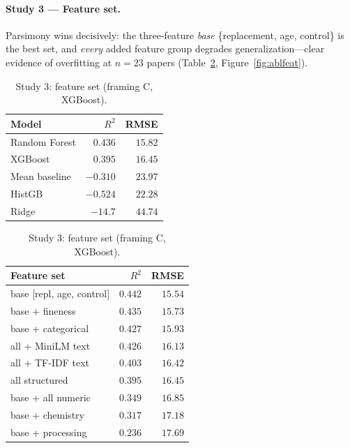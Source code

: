 \documentclass[11pt]{article}
\newcommand{\R}{$R^2$}
\begin{document}
\paragraph{Study 3 --- Feature set.}
Parsimony wins decisively: the three-feature \emph{base}
\{replacement, age, control\} is the best set, and \emph{every} added feature group
degrades generalization---clear evidence of overfitting at $n\!=\!23$ papers
(Table~\ref{tab:s3}, Figure~\ref{fig:ablfeat}).

\begin{table}[H]\centering\small
\begin{minipage}{0.46\textwidth}\centering
\caption{Study 2: model (framing C, all features).}
\label{tab:s2}
\begin{tabular}{lrr}
\toprule
Model & \R{} & RMSE \\
\midrule
\rowcolor{green!12}Random Forest & $0.436$ & $15.82$ \\
XGBoost & $0.395$ & $16.45$ \\
Mean baseline & $-0.310$ & $23.97$ \\
HistGB & $-0.524$ & $22.28$ \\
Ridge & $-14.7$ & $44.74$ \\
\bottomrule
\end{tabular}
\end{minipage}\hfill
\begin{minipage}{0.5\textwidth}\centering
\caption{Study 3: feature set (framing C, XGBoost).}
\label{tab:s3}
\begin{tabular}{lrr}
\toprule
Feature set & \R{} & RMSE \\
\midrule
\rowcolor{green!12}base [repl, age, control] & $0.442$ & $15.54$ \\
base + fineness & $0.435$ & $15.73$ \\
base + categorical & $0.427$ & $15.93$ \\
all + MiniLM text & $0.426$ & $16.13$ \\
all + TF-IDF text & $0.403$ & $16.42$ \\
all structured & $0.395$ & $16.45$ \\
base + all numeric & $0.349$ & $16.85$ \\
base + chemistry & $0.317$ & $17.18$ \\
base + processing & $0.236$ & $17.69$ \\
\bottomrule
\end{tabular}
\end{minipage}
\end{table}
\end{document}
